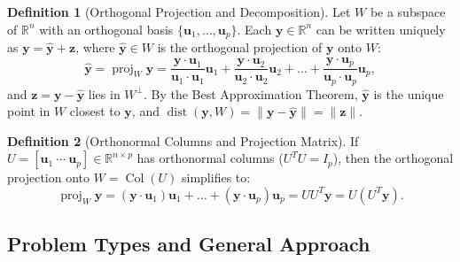 \documentclass[11pt, letterpaper]{article}
\theoremstyle{definition}
\newtheorem{definition}{Definition}[section]
\theoremstyle{remark}
\newcommand{\R}{\mathbb{R}}
\begin{document}
\begin{definition}[Orthogonal Projection and Decomposition]
Let $W$ be a subspace of $\R^n$ with an orthogonal basis $\{\mathbf{u}_1, \dots, \mathbf{u}_p\}$. Each $\mathbf{y} \in \R^n$ can be written uniquely as $\mathbf{y} = \hat{\mathbf{y}} + \mathbf{z}$, where $\hat{\mathbf{y}} \in W$ is the orthogonal projection of $\mathbf{y}$ onto $W$:
\[
\hat{\mathbf{y}} = \operatorname{proj}_W \mathbf{y} = \frac{\mathbf{y} \cdot \mathbf{u}_1}{\mathbf{u}_1 \cdot \mathbf{u}_1}\mathbf{u}_1 + \frac{\mathbf{y} \cdot \mathbf{u}_2}{\mathbf{u}_2 \cdot \mathbf{u}_2}\mathbf{u}_2 + \dots + \frac{\mathbf{y} \cdot \mathbf{u}_p}{\mathbf{u}_p \cdot \mathbf{u}_p}\mathbf{u}_p,
\]
and $\mathbf{z} = \mathbf{y} - \hat{\mathbf{y}}$ lies in $W^\perp$. By the Best Approximation Theorem, $\hat{\mathbf{y}}$ is the unique point in $W$ closest to $\mathbf{y}$, and $\operatorname{dist}(\mathbf{y}, W) = \|\mathbf{y} - \hat{\mathbf{y}}\| = \|\mathbf{z}\|$.
\end{definition}

\begin{definition}[Orthonormal Columns and Projection Matrix]
If $U = [\mathbf{u}_1 \ \cdots \ \mathbf{u}_p] \in \R^{n \times p}$ has orthonormal columns ($U^T U = I_p$), then the orthogonal projection onto $W = \operatorname{Col}(U)$ simplifies to:
\[
\operatorname{proj}_W \mathbf{y} = (\mathbf{y} \cdot \mathbf{u}_1)\mathbf{u}_1 + \dots + (\mathbf{y} \cdot \mathbf{u}_p)\mathbf{u}_p = UU^T \mathbf{y} = U(U^T \mathbf{y}).
\]
\end{definition}

\subsection{Problem Types and General Approach}
\end{document}
